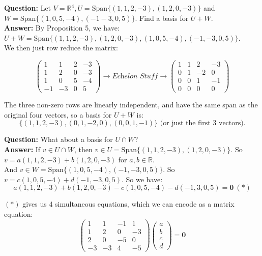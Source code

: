 \documentclass[twoside]{scrartcl}
\begin{document}
\begin{examples}\item \textbf{Question:} 
 Let $V = \mathbb{R}^4, U = \text{Span}\{(1,1,2,-3),(1,2,0,-3)\}$  and\\ $W = \text{Span}\{(1,0,5,-4),(-1-3,0,5)\}.$ Find a basis for $U + W.$ \\

\textbf{Answer:} By Proposition 5, we have:\\

 $U + W = \text{Span}\{(1,1,2,-3),(1,2,0,-3),(1,0,5,-4),(-1,-3,0,5)\}$.\\ 
 
 We then just row reduce the matrix:
 
 \[\begin{pmatrix}
 1 & 1 & 2 & -3\\
 1 & 2 & 0 & -3\\
 1 & 0 & 5 & -4\\
 -1 & -3 & 0 & 5
 \end{pmatrix} \rightarrow \textit{Echelon Stuff} \rightarrow
 \begin{pmatrix}
 1 & 1 & 2 & -3\\
 0 & 1 &-2 & 0\\
 0 & 0 & 1 & -1\\
 0 & 0 & 0 & 0
 \end{pmatrix}  \]

The three non-zero rows are linearly independent, and have the same span as the original four vectors, so a basis for $U + W$ is:
\[\{(1,1,2,-3),(0,1,-2,0),(0,0,1,-1)\} \text{ (or just the first 3 vectors).}\]

\item \textbf{Question:} What about a basis for $U \cap W$?\\

\textbf{Answer:} If $v \in U \cap W$, then $v \in U = \text{Span}\{(1,1,2,-3),(1,2,0,-3)\}.$ So $v = a(1,1,2,-3) + b(1,2,0,-3)$ for $a,b \in \mathbb{R}$.\\

 And $v \in W = \text{Span}\{(1,0,5,-4),(-1,-3,0,5)\}$. So $v = c(1,0,5,-4) + d(-1,-3,0,5)$. So we have:
\[a(1,1,2,-3) + b(1,2,0,-3) -c(1,0,5,-4) -d(-1,3,0,5) = \mathbf{0} ~(*)\]

$(*)$ gives us 4 simultaneous equations, which we can encode as a matrix equation:
\[
\begin{pmatrix}
1 & 1 & -1 & 1\\
1 & 2 & 0 & -3\\
2 & 0 & -5 & 0\\
-3 & -3 & 4 & -5
\end{pmatrix}
\begin{pmatrix}
a\\b\\c\\d
\end{pmatrix}
=
\mathbf{0} \]


\end{examples}
\end{document}
